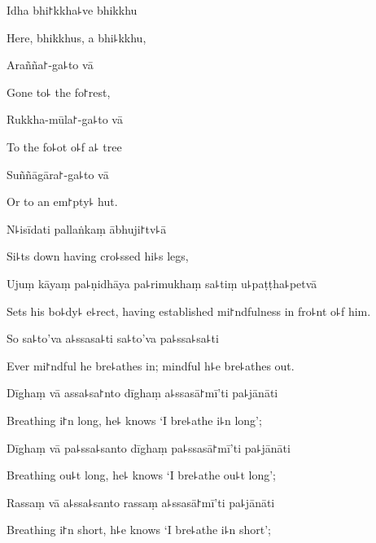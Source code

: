 Idha bhi꜓kkha꜕ve bhikkhu

\begin{english}
  Here, bhikkhus, a bhi꜕kkhu,
\end{english}

Arañña꜓-ga꜕to vā

\begin{english}
  Gone to꜕ the fo꜓rest,
\end{english}

Rukkha-mūla꜓-ga꜕to vā

\begin{english}
  To the fo꜕ot o꜕f a꜕ tree
\end{english}

Suññāgāra꜓-ga꜕to vā

\begin{english}
  Or to an em꜓pty꜕ hut.
\end{english}

N꜕isīdati pallaṅkaṃ ābhuji꜓tv꜕ā

\begin{english}
  Si꜕ts down having cro꜕ssed hi꜕s legs,
\end{english}

Ujuṃ kāyaṃ pa꜕ṇidhāya pa꜕rimukhaṃ sa꜕tiṃ u꜕paṭṭha꜕petvā

\begin{english}
  Sets his bo꜕dy꜕ e꜕rect, having established mi꜓ndfulness in fro꜕nt o꜕f him.
\end{english}

So sa꜕to'va a꜕ssasa꜕ti sa꜕to'va pa꜕ssa꜕sa꜕ti

\begin{english}
  Ever mi꜓ndful he bre꜕athes in; mindful h꜕e bre꜕athes out.
\end{english}

Dīghaṃ vā assa꜕sa꜓nto dīghaṃ a꜕ssasā꜓mī'ti pa꜕jānāti

\begin{english}
  Breathing i꜓n long, he꜕ knows `I bre꜕athe i꜕n long';
\end{english}

Dīghaṃ vā pa꜕ssa꜕santo dīghaṃ pa꜕ssasā꜓mī'ti pa꜕jānāti

\begin{english}
  Breathing ou꜕t long, he꜕ knows `I bre꜕athe ou꜕t long';
\end{english}

Rassaṃ vā a꜕ssa꜕santo rassaṃ a꜕ssasā꜓mī'ti pa꜕jānāti

\begin{english}
  Breathing i꜓n short, h꜕e knows `I bre꜕athe i꜕n short';
\end{english}

